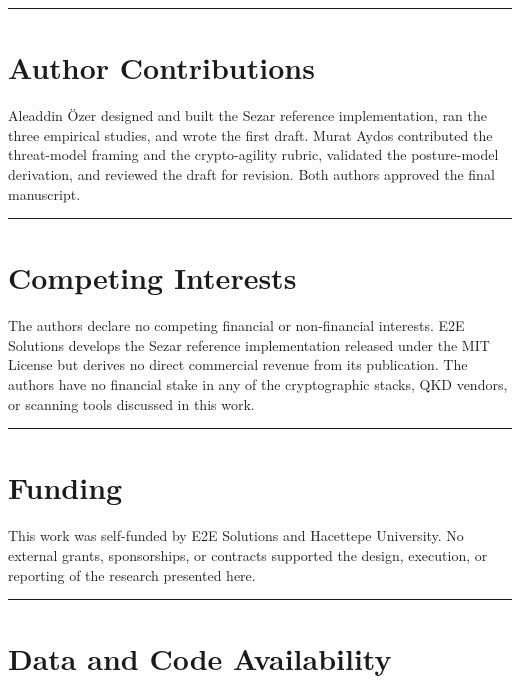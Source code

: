 \begin{center}\rule{0.5\linewidth}{0.5pt}\end{center}

\section{Author Contributions}\label{author-contributions}

Aleaddin Özer designed and built the Sezar reference implementation, ran
the three empirical studies, and wrote the first draft. Murat Aydos
contributed the threat-model framing and the crypto-agility rubric,
validated the posture-model derivation, and reviewed the draft for
revision. Both authors approved the final manuscript.

\begin{center}\rule{0.5\linewidth}{0.5pt}\end{center}

\section{Competing Interests}\label{competing-interests}

The authors declare no competing financial or non-financial interests.
E2E Solutions develops the Sezar reference implementation released under
the MIT License but derives no direct commercial revenue from its
publication. The authors have no financial stake in any of the
cryptographic stacks, QKD vendors, or scanning tools discussed in this
work.

\begin{center}\rule{0.5\linewidth}{0.5pt}\end{center}

\section{Funding}\label{funding}

This work was self-funded by E2E Solutions and Hacettepe University. No
external grants, sponsorships, or contracts supported the design,
execution, or reporting of the research presented here.

\begin{center}\rule{0.5\linewidth}{0.5pt}\end{center}

\section{Data and Code Availability}\label{data-and-code-availability}

